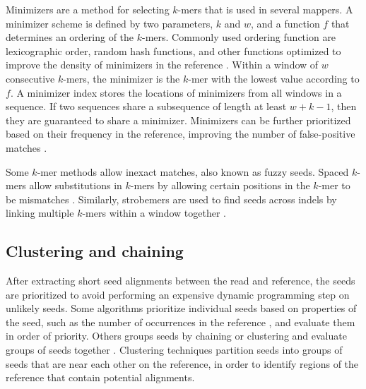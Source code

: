 \documentclass[11pt]{ucscthesis}
\begin{document}
Minimizers are a method for selecting $k$-mers that is used in several mappers.
A minimizer scheme is defined by two parameters, $k$ and $w$, and a function $f$ that determines an ordering of the $k$-mers.
Commonly used ordering function are lexicographic order, random hash functions, and other functions optimized to improve the density of minimizers in the reference \cite{zheng_minimizers_2020,marcais_minimizers_2018}.
Within a window of $w$ consecutive $k$-mers, the minimizer is the $k$-mer with the lowest value according to $f$.
A minimizer index stores the locations of minimizers from all windows in a sequence.
If two sequences share a subsequence of length at least $w+k-1$, then they are guaranteed to share a minimizer.
Minimizers can be further prioritized based on their frequency in the reference, improving the number of false-positive matches \cite{jain_winnowmap_2020}.

Some $k$-mer methods allow inexact matches, also known as fuzzy seeds.
Spaced $k$-mers allow substitutions in $k$-mers by allowing certain positions in the $k$-mer to be mismatches \cite{ma_patternhunter_2002}.
Similarly, strobemers are used to find seeds across indels by linking multiple $k$-mers within a window together \cite{sahlin_strobemers_2021}.


\subsection{Clustering and chaining}

After extracting short seed alignments between the read and reference, the seeds are prioritized to avoid performing an expensive dynamic programming step on unlikely seeds.
Some algorithms prioritize individual seeds based on properties of the seed, such as the number of occurrences in the reference  \cite{langmead_bowtie2_2012}, and evaluate them in order of priority.
Others groups seeds by chaining or clustering and evaluate groups of seeds together \cite{li_bwa_mem_2013,li_minimap2_2018,lee_mosaik_2014,jain_mashmap_2018}.
Clustering techniques partition seeds into groups of seeds that are near each other on the reference, in order to identify regions of the reference that contain potential alignments.
\end{document}
